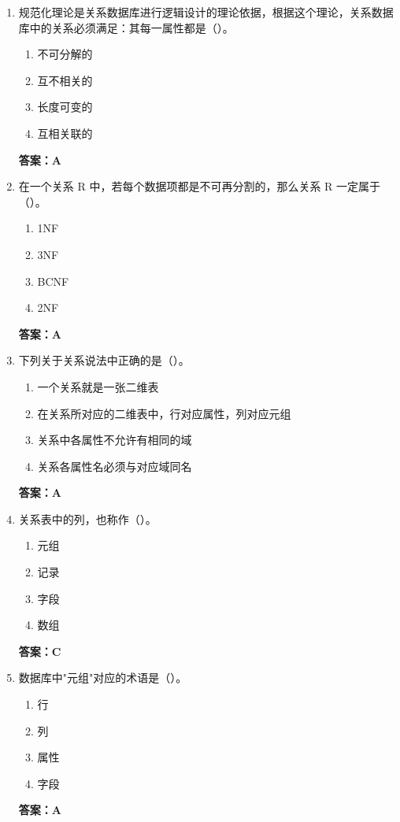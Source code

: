 \documentclass[12pt, a4paper]{article}
\begin{document}
\begin{enumerate}[label=\arabic*.]
	\item 规范化理论是关系数据库进行逻辑设计的理论依据，根据这个理论，关系数据库中的关系必须满足：其每一属性都是（\quad）。
	      \begin{enumerate}
		      \item 不可分解的
		      \item 互不相关的
		      \item 长度可变的
		      \item 互相关联的
	      \end{enumerate}
	      \textbf{答案：A}

	\item 在一个关系 R 中，若每个数据项都是不可再分割的，那么关系 R 一定属于（\quad）。
	      \begin{enumerate}
		      \item 1NF
		      \item 3NF
		      \item BCNF
		      \item 2NF
	      \end{enumerate}
	      \textbf{答案：A}

	\item 下列关于关系说法中正确的是（\quad）。
	      \begin{enumerate}
		      \item 一个关系就是一张二维表
		      \item 在关系所对应的二维表中，行对应属性，列对应元组
		      \item 关系中各属性不允许有相同的域
		      \item 关系各属性名必须与对应域同名
	      \end{enumerate}
	      \textbf{答案：A}

	\item 关系表中的列，也称作（\quad）。
	      \begin{enumerate}
		      \item 元组
		      \item 记录
		      \item 字段
		      \item 数组
	      \end{enumerate}
	      \textbf{答案：C}

	\item 数据库中"元组"对应的术语是（\quad）。
	      \begin{enumerate}
		      \item 行
		      \item 列
		      \item 属性
		      \item 字段
	      \end{enumerate}
	      \textbf{答案：A}


\end{enumerate}
\end{document}
